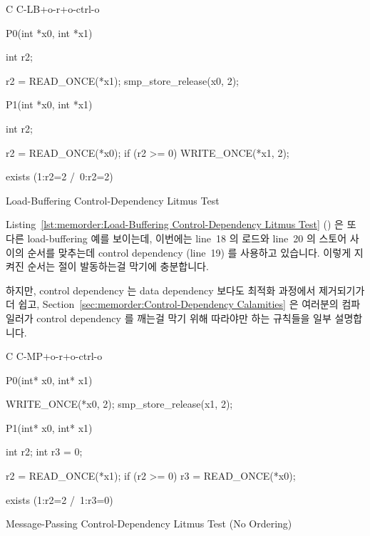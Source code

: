 \begin{listing}[tbp]
{ \scriptsize
\begin{verbbox}[\LstLineNo]
C C-LB+o-r+o-ctrl-o
{
}

P0(int *x0, int *x1)
{
  int r2;

  r2 = READ_ONCE(*x1);
  smp_store_release(x0, 2);
}


P1(int *x0, int *x1)
{
  int r2;

  r2 = READ_ONCE(*x0);
  if (r2 >= 0)
    WRITE_ONCE(*x1, 2);
}

exists (1:r2=2 /\ 0:r2=2)
\end{verbbox}
}
\centering
\theverbbox
\caption{Load-Buffering Control-Dependency Litmus Test}
\label{lst:memorder:Load-Buffering Control-Dependency Litmus Test}
\end{listing}

Listing~\ref{lst:memorder:Load-Buffering Control-Dependency Litmus Test}
()
은 또다른 load-buffering 예를 보이는데, 이번에는 line~18 의 로드와 line~20 의
스토어 사이의 순서를 맞추는데 control dependency (line~19) 를 사용하고
있습니다.
이렇게 지켜진 순서는  절이 발동하는걸 막기에 충분합니다.

하지만, control dependency 는 data dependency 보다도 최적화 과정에서 제거되기가
더 쉽고, Section~\ref{sec:memorder:Control-Dependency Calamities}
은 여러분의 컴파일러가 control dependency 를 깨는걸 막기 위해 따라야만 하는
규칙들을 일부 설명합니다.

\begin{listing}[tbp]
{ \scriptsize
\begin{verbbox}[\LstLineNo]
C C-MP+o-r+o-ctrl-o

{
}

P0(int* x0, int* x1) {

  WRITE_ONCE(*x0, 2);
  smp_store_release(x1, 2);

}

P1(int* x0, int* x1) {
  int r2;
  int r3 = 0;

  r2 = READ_ONCE(*x1);
  if (r2 >= 0)
    r3 = READ_ONCE(*x0);

}

exists (1:r2=2 /\ 1:r3=0)
\end{verbbox}
}
\centering
\theverbbox
\caption{Message-Passing Control-Dependency Litmus Test (No Ordering)}
\label{lst:memorder:Message-Passing Control-Dependency Litmus Test (No Ordering)}
\end{listing}

